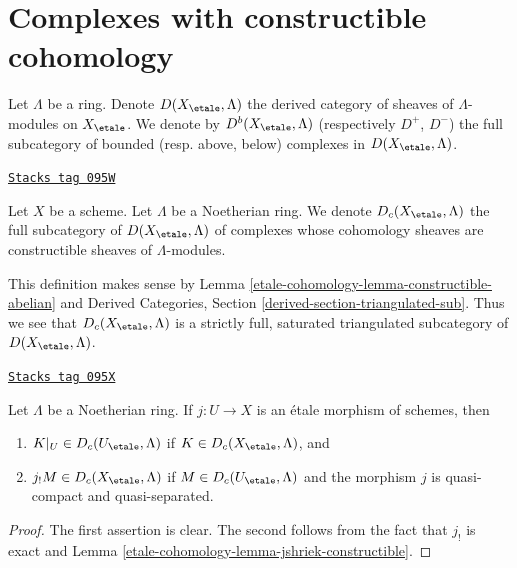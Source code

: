 \section{Complexes with constructible cohomology}
\label{etale-cohomology-section-Dc}
Let $\Lambda$ be a ring. Denote $D(X_\etale, \Lambda)$ the derived category
of sheaves of $\Lambda$-modules on $X_\etale$.
We denote by $D^b(X_\etale, \Lambda)$ (respectively $D^+$, $D^-$)
the full subcategory of bounded (resp. above, below) complexes in
$D(X_\etale, \Lambda)$.

\begin{definition}[C]
\label{etale-cohomology-definition-c}
\href{https://stacks.math.columbia.edu/tag/095W}{\texttt{Stacks tag 095W}}

Let $X$ be a scheme. Let $\Lambda$ be a Noetherian ring.
We denote {\it $D_c(X_\etale, \Lambda)$} the full subcategory
of $D(X_\etale, \Lambda)$ of complexes whose cohomology sheaves
are constructible sheaves of $\Lambda$-modules.
\end{definition}

This definition makes sense by Lemma \ref{etale-cohomology-lemma-constructible-abelian} and
Derived Categories, Section \ref{derived-section-triangulated-sub}.
Thus we see that $D_c(X_\etale, \Lambda)$ is a strictly full, saturated
triangulated subcategory of $D(X_\etale, \Lambda)$.

\begin{lemma}
\label{etale-cohomology-lemma-restrict-and-shriek-from-etale-c}
\href{https://stacks.math.columbia.edu/tag/095X}{\texttt{Stacks tag 095X}}

Let $\Lambda$ be a Noetherian ring.
If $j : U \to X$ is an \'etale morphism of schemes, then
\begin{enumerate}
\item $K|_U \in D_c(U_\etale, \Lambda)$ if $K \in D_c(X_\etale, \Lambda)$, and
\item $j_!M \in D_c(X_\etale, \Lambda)$ if $M \in D_c(U_\etale, \Lambda)$ and
the morphism $j$ is quasi-compact and quasi-separated.
\end{enumerate}
\end{lemma}

\begin{proof}
The first assertion is clear. The second follows from the fact
that $j_!$ is exact and Lemma \ref{etale-cohomology-lemma-jshriek-constructible}.
\end{proof}

